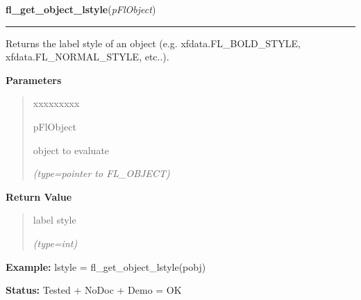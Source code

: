     \vspace{0.5ex}

\hspace{.8\funcindent}\begin{boxedminipage}{\funcwidth}

    \raggedright \textbf{fl\_get\_object\_lstyle}(\textit{pFlObject})

    \vspace{-1.5ex}

    \rule{\textwidth}{0.5\fboxrule}
\setlength{\parskip}{2ex}
    Returns the label style of an object (e.g. xfdata.FL\_BOLD\_STYLE, 
    xfdata.FL\_NORMAL\_STYLE, etc..).

\setlength{\parskip}{1ex}
      \textbf{Parameters}
      \vspace{-1ex}

      \begin{quote}
        \begin{Ventry}{xxxxxxxxx}

          \item[pFlObject]

          object to evaluate

            {\it (type=pointer to FL\_OBJECT)}

        \end{Ventry}

      \end{quote}

      \textbf{Return Value}
    \vspace{-1ex}

      \begin{quote}
      label style

      {\it (type=int)}

      \end{quote}

\textbf{Example:} lstyle = fl\_get\_object\_lstyle(pobj)



\textbf{Status:} Tested + NoDoc + Demo = OK



    \end{boxedminipage}

    \label{xformslib:flbasic:fl_set_object_lcol}

    \vspace{0.5ex}

